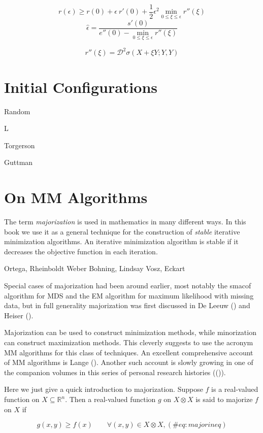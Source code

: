 \documentclass[
  12pt,
  letterpaper,
  DIV=11,
  numbers=noendperiod]{scrreprt}
\theoremstyle{remark}
\begin{document}
\[
r(\epsilon)\geq r(0)+\epsilon\ r'(0)+\frac12\epsilon^2\min_{0\leq \xi\leq\epsilon}r''(\xi)
\] \[
\hat\epsilon=\frac{s'(0)}{e''(0)-\min_{0\leq \xi\leq\epsilon}r''(\xi)}
\]

\[
r''(\xi)=\mathcal{D}^2\sigma(X+\xi Y;Y,Y)
\]

\section{Initial Configurations}\label{initial-configurations}

Random

L

Torgerson

Guttman

\section{On MM Algorithms}\label{apmajmin}

The term \emph{majorization} is used in mathematics in many different
ways. In this book we use it as a general technique for the construction
of \emph{stable} iterative minimization algorithms. An iterative
minimization algorithm is stable if it decreases the objective function
in each iteration.

Ortega, Rheinboldt Weber Bohning, Lindsay Vosz, Eckart

Special cases of majorization had been around earlier, most notably the
smacof algorithm for MDS and the EM algorithm for maximum likelihood
with missing data, but in full generality majorization was first
discussed in De Leeuw () and Heiser
().

Majorization can be used to construct minimization methods, while
minorization can construct maximization methods. This cleverly suggests
to use the acronym MM algorithms for this class of techniques. An
excellent comprehensive account of MM algorithms is Lange
(). Another such account is slowly growing
in one of the companion volumes in this series of personal research
histories (()).

Here we just give a quick introduction to majorization. Suppose \(f\) is
a real-valued function on \(X\subseteq\mathbb{R}^n\). Then a real-valued
function \(g\) on \(X\otimes X\) is said to majorize \(f\) on \(X\) if

\begin{equation}
g(x,y)\geq f(x)\qquad\forall (x,y)\in X\otimes X,
(\#eq:majorineq)
\end{equation}
\end{document}
